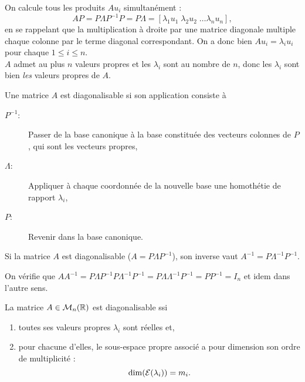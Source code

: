 \proof
  On calcule tous les produits $A u_i$ simultanément : 
  $$
  A P 
  = P \Lambda P^{-1} P 
  = P \Lambda
  = [\lambda_1 u_1 \; \lambda_2 u_2 \; \dots \lambda_n u_n],
  $$
  en se rappelant que la multiplication à droite par une matrice diagonale multiple chaque colonne par le terme diagonal correspondant. On a donc bien $A u_i = \lambda_i u_i$ pour chaque $1 \leq i \leq n$. \\
  $A$ admet au plus $n$ valeurs propres et les $\lambda_i$ sont au nombre de $n$, donc les $\lambda_i$ sont bien {\em les} valeurs propres de $A$.
\eproof

\remark
Une matrice $A$ est diagonalisable si son application consiste à
\begin{description}
 \item[$P^{-1}$:] Passer de la base canonique à la base constituée des vecteurs colonnes de $P$, qui sont les vecteurs propres,
 \item[$\Lambda$:] Appliquer à chaque coordonnée de la nouvelle base une homothétie de rapport $\lambda_i$,
 \item[$P$:] Revenir dans la base canonique.
\end{description}



\begin{proposition}
  Si la matrice $A$ est diagonalisable ($A = P \Lambda P^{-1}$), son inverse vaut $A^{-1} = P \Lambda^{-1} P^{-1}$.
\end{proposition}

\proof
On vérifie que $A A^{-1} = P \Lambda P^{-1} P \Lambda^{-1} P^{-1} = P \Lambda \Lambda^{-1} P^{-1} = P P^{-1} = I_n$ et idem dans l'autre sens.
\eproof

\begin{theorem}
  La matrice $A \in \mathcal{M}_n(\mathbb{R})$ est diagonalisable ssi 
  \begin{enumerate}
   \item toutes ses valeurs propres $\lambda_i$ sont réelles et, 
   \item pour chacune d'elles, le sous-espace propre associé a pour dimension son ordre de multiplicité : 
   $$
   \dim(\mathcal{E}(\lambda_i)) = m_i.
   $$
  \end{enumerate}
\end{theorem}

